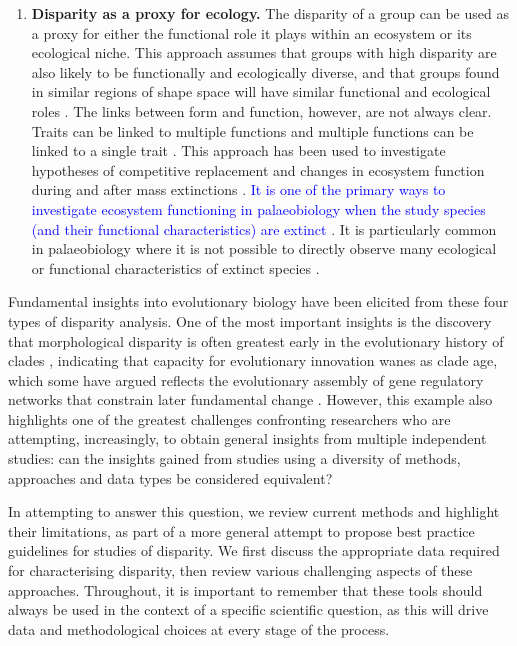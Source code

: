 \documentclass[12pt,letterpaper]{article}
\begin{document}
\begin{enumerate}
	\item \textbf{Disparity as a proxy for ecology.} The disparity of a group can be used as a proxy for either the functional role it plays within an ecosystem or its ecological niche.
	This approach assumes that groups with high disparity are also likely to be functionally and ecologically diverse, and that groups found in similar regions of shape space will have similar functional and ecological roles \citep{Pierce2008, Friedman2010}.
	The links between form and function, however, are not always clear.
	Traits can be linked to multiple functions and multiple functions can be linked to a single trait \citep{Wainwright2005}.
	This approach has been used to investigate hypotheses of competitive replacement \citep{tyler2011detecting} and changes in ecosystem function during and after mass extinctions \citep{Friedman2010}.
    \textcolor{blue}{It is one of the primary ways to investigate ecosystem functioning in palaeobiology when the study species (and their functional characteristics) are extinct} \citep{Wainwright2005}.
	It is particularly common in palaeobiology where it is not possible to directly observe many ecological or functional characteristics of extinct species \citep{Wainwright2005}.

\end{enumerate}

Fundamental insights into evolutionary biology have been elicited from these four types of disparity analysis.
One of the most important insights is the discovery that morphological disparity is often greatest early in the evolutionary history of clades \citep{Foote1997, Erwin2007, Hughes2013}, indicating that capacity for evolutionary innovation wanes as clade age, which some have argued reflects the evolutionary assembly of gene regulatory networks that constrain later fundamental change \citep{Erwin2007, Hughes2013}.
However, this example also highlights one of the greatest challenges confronting researchers who are attempting, increasingly, to obtain general insights from multiple independent studies: can the insights gained from studies using a diversity of methods, approaches and data types be considered equivalent?

In attempting to answer this question, we review current methods and highlight their limitations, as part of a more general attempt to propose best practice guidelines for studies of disparity.
We first discuss the appropriate data required for characterising disparity, then review various challenging aspects of these approaches.
Throughout, it is important to remember that these tools should always be used in the context of a specific scientific question, as this will drive data and methodological choices at every stage of the process.
\end{document}
